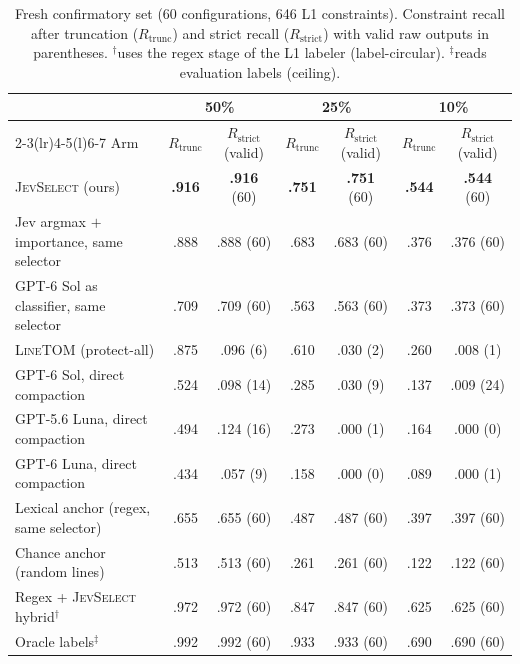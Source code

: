 \documentclass[11pt,a4paper]{article}
\newcommand{\sel}{\textsc{JevSelect}}
\newcommand{\linetom}{\textsc{LineTOM}}
\newcommand{\Rt}{R_{\mathrm{trunc}}}
\newcommand{\Rs}{R_{\mathrm{strict}}}
\begin{document}
\begin{table}[t]\centering\small
\caption{Fresh confirmatory set (60 configurations, 646 L1 constraints). Constraint recall after truncation ($\Rt$) and strict recall ($\Rs$) with valid raw outputs in parentheses. $^\dagger$uses the regex stage of the L1 labeler (label-circular). $^\ddagger$reads evaluation labels (ceiling).}\label{tab:fresh}
\setlength{\tabcolsep}{2.7pt}
\begin{tabular}{@{}lcccccc@{}}\toprule
& \multicolumn{2}{c}{50\%} & \multicolumn{2}{c}{25\%} & \multicolumn{2}{c}{10\%}\\\cmidrule(lr){2-3}\cmidrule(lr){4-5}\cmidrule(l){6-7}
Arm & $\Rt$ & $\Rs$ (valid) & $\Rt$ & $\Rs$ (valid) & $\Rt$ & $\Rs$ (valid)\\\midrule
\sel{} (ours) & \textbf{.916} & \textbf{.916} (60) & \textbf{.751} & \textbf{.751} (60) & \textbf{.544} & \textbf{.544} (60)\\
Jev argmax $+$ importance, same selector & .888 & .888 (60) & .683 & .683 (60) & .376 & .376 (60)\\
GPT-6 Sol as classifier, same selector & .709 & .709 (60) & .563 & .563 (60) & .373 & .373 (60)\\
\linetom{} (protect-all) & .875 & .096 (6) & .610 & .030 (2) & .260 & .008 (1)\\
GPT-6 Sol, direct compaction & .524 & .098 (14) & .285 & .030 (9) & .137 & .009 (24)\\
GPT-5.6 Luna, direct compaction & .494 & .124 (16) & .273 & .000 (1) & .164 & .000 (0)\\
GPT-6 Luna, direct compaction & .434 & .057 (9) & .158 & .000 (0) & .089 & .000 (1)\\\midrule
Lexical anchor (regex, same selector) & .655 & .655 (60) & .487 & .487 (60) & .397 & .397 (60)\\
Chance anchor (random lines) & .513 & .513 (60) & .261 & .261 (60) & .122 & .122 (60)\\
Regex + \sel{} hybrid$^\dagger$ & .972 & .972 (60) & .847 & .847 (60) & .625 & .625 (60)\\
Oracle labels$^\ddagger$ & .992 & .992 (60) & .933 & .933 (60) & .690 & .690 (60)\\\bottomrule
\end{tabular}
\end{table}
\end{document}
